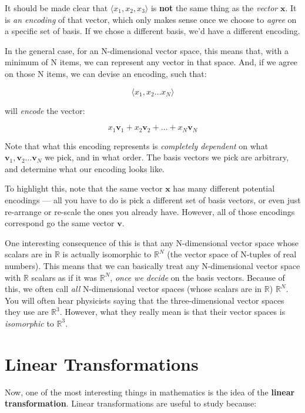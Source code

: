 \documentclass[]{article}
\begin{document}
It should be made clear that \(\langle x_1, x_2, x_3 \rangle\) is \textbf{not}
the same thing as the \emph{vector} \(\mathbf{x}\). It is \emph{an encoding} of
that vector, which only makes sense once we choose to \emph{agree} on a specific
set of basis. If we chose a different basis, we'd have a different encoding.

In the general case, for an N-dimensional vector space, this means that, with a
minimum of N items, we can represent any vector in that space. And, if we agree
on those N items, we can devise an encoding, such that:

\[
\langle x_1, x_2 \dots x_N \rangle
\]

will \emph{encode} the vector:

\[
x_1 \mathbf{v}_1 + x_2 \mathbf{v}_2 + \ldots + x_N \mathbf{v}_N
\]

Note that what this encoding represents is \emph{completely dependent} on what
\(\mathbf{v}_1, \mathbf{v}_2 \ldots \mathbf{v}_N\) we pick, and in what order.
The basis vectors we pick are arbitrary, and determine what our encoding looks
like.

To highlight this, note that the same vector \(\mathbf{x}\) has many different
potential encodings --- all you have to do is pick a different set of basis
vectors, or even just re-arrange or re-scale the ones you already have. However,
all of those encodings correspond go the same vector \(\mathbf{v}\).

One interesting consequence of this is that any N-dimensional vector space whose
scalars are in \(\mathbb{R}\) is actually isomorphic to \(\mathbb{R}^N\) (the
vector space of N-tuples of real numbers). This means that we can basically
treat any N-dimensional vector space with \(\mathbb{R}\) scalars as if it was
\(\mathbb{R}^N\), \emph{once we decide} on the basis vectors. Because of this,
we often call \emph{all} N-dimensional vector spaces (whose scalars are in
\(\mathbb{R}\)) \(\mathbb{R}^N\). You will often hear physicists saying that the
three-dimensional vector spaces they use are \(\mathbb{R}^3\). However, what
they really mean is that their vector spaces is \emph{isomorphic} to
\(\mathbb{R}^3\).

\section{Linear Transformations}\label{linear-transformations}

Now, one of the most interesting things in mathematics is the idea of the
\textbf{linear transformation}. Linear transformations are useful to study
because:
\end{document}
